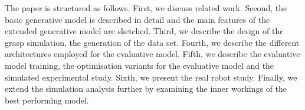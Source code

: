 
The paper is structured as follows. First, we discuss related work. Second, the basic generative model is described in detail and the main features of the extended generative model are sketched. Third, we describe the design of the grasp simulation, the generation of the data set. Fourth, we describe the different architectures employed for the evaluative model. Fifth, we describe the evaluative model training, the optimisation variants for the evaluative model and the simulated experimental study. Sixth, we present the real robot study. Finally, we extend the simulation analysis further by examining the inner workings of the best performing model.
